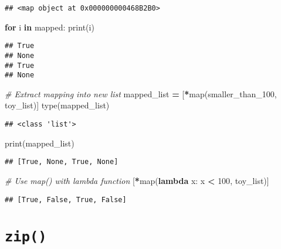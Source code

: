 \documentclass[
]{book}
\newenvironment{Shaded}{\begin{snugshade}}{\end{snugshade}}
\newcommand{\BuiltInTok}[1]{#1}
\newcommand{\CommentTok}[1]{\textcolor[rgb]{0.56,0.35,0.01}{\textit{#1}}}
\newcommand{\ControlFlowTok}[1]{\textcolor[rgb]{0.13,0.29,0.53}{\textbf{#1}}}
\newcommand{\DecValTok}[1]{\textcolor[rgb]{0.00,0.00,0.81}{#1}}
\newcommand{\KeywordTok}[1]{\textcolor[rgb]{0.13,0.29,0.53}{\textbf{#1}}}
\newcommand{\NormalTok}[1]{#1}
\newcommand{\OperatorTok}[1]{\textcolor[rgb]{0.81,0.36,0.00}{\textbf{#1}}}
\begin{document}
\begin{verbatim}
## <map object at 0x000000000468B2B0>
\end{verbatim}

\begin{Shaded}
\begin{Highlighting}[]
\ControlFlowTok{for}\NormalTok{ i }\KeywordTok{in}\NormalTok{ mapped:}
    \BuiltInTok{print}\NormalTok{(i)}
\end{Highlighting}
\end{Shaded}

\begin{verbatim}
## True
## None
## True
## None
\end{verbatim}

\begin{Shaded}
\begin{Highlighting}[]
\CommentTok{\# Extract mapping into new list}
\NormalTok{mapped\_list }\OperatorTok{=}\NormalTok{ [}\OperatorTok{*}\BuiltInTok{map}\NormalTok{(smaller\_than\_100, toy\_list)]}
\BuiltInTok{type}\NormalTok{(mapped\_list)}
\end{Highlighting}
\end{Shaded}

\begin{verbatim}
## <class 'list'>
\end{verbatim}

\begin{Shaded}
\begin{Highlighting}[]
\BuiltInTok{print}\NormalTok{(mapped\_list)}
\end{Highlighting}
\end{Shaded}

\begin{verbatim}
## [True, None, True, None]
\end{verbatim}

\begin{Shaded}
\begin{Highlighting}[]
\CommentTok{\# Use map() with lambda function}
\NormalTok{[}\OperatorTok{*}\BuiltInTok{map}\NormalTok{(}\KeywordTok{lambda}\NormalTok{ x: x }\OperatorTok{\textless{}} \DecValTok{100}\NormalTok{, toy\_list)]}
\end{Highlighting}
\end{Shaded}

\begin{verbatim}
## [True, False, True, False]
\end{verbatim}

\hypertarget{zip}{%
\section{\texorpdfstring{\texttt{zip()}}{zip()}}\label{zip}}
\end{document}
